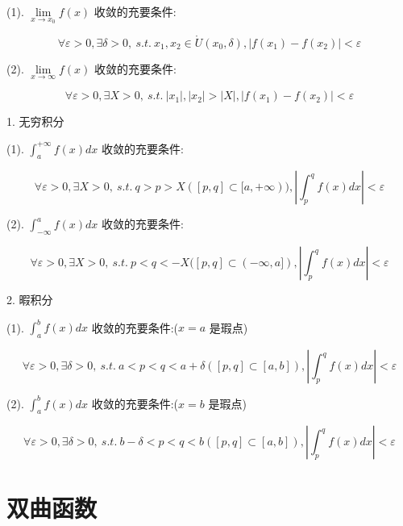 \begin{proposition}[柯西收敛准则:函数]
	(1). $\lim\limits_{x \to x_{0}}f(x)$ 收敛的充要条件:

	$$\forall \varepsilon > 0, \exists \delta > 0,\ s.t.\ x_{1},x_{2}\in \mathring{U}(x_{0},\delta), |f(x_{1})-f(x_{2})| < \varepsilon$$

	(2). $\lim\limits_{x \to \infty}f(x)$ 收敛的充要条件:

	$$\forall \varepsilon > 0, \exists X > 0,\ s.t.\ |x_{1}|,|x_{2}| > |X|, |f(x_{1})-f(x_{2})| < \varepsilon$$
\end{proposition}
\begin{proposition}
	1. 无穷积分

	(1). $\int_{a}^{+\infty}f(x)dx$ 收敛的充要条件:

	$$\forall \varepsilon > 0, \exists X > 0,\ s.t.\ q > p > X([p,q]\subset [a,+\infty)), |\int_{p}^{q}f(x)dx| < \varepsilon$$

	(2). $\int_{-\infty}^{a}f(x)dx$ 收敛的充要条件:

	$$\forall \varepsilon > 0, \exists X > 0,\ s.t.\ p < q < -X([p,q]\subset (-\infty,a]), |\int_{p}^{q}f(x)dx| < \varepsilon$$


	2. 暇积分

	(1). $\int_{a}^{b}f(x)dx$ 收敛的充要条件:($x = a$ 是瑕点)

	$$\forall \varepsilon > 0, \exists \delta > 0,\ s.t.\ a < p < q < a + \delta ([p,q]\subset [a,b]), |\int_{p}^{q}f(x)dx| < \varepsilon$$

	(2). $\int_{a}^{b}f(x)dx$ 收敛的充要条件:($x = b$ 是瑕点)

	$$\forall \varepsilon > 0, \exists \delta > 0,\ s.t.\ b - \delta < p < q < b ([p,q]\subset [a,b]), |\int_{p}^{q}f(x)dx| < \varepsilon$$
\end{proposition}

\begin{proposition}
	
\end{proposition}

\section{双曲函数}

